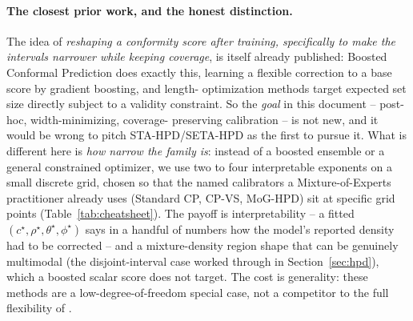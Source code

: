 \documentclass[11pt]{article}
\begin{document}
\paragraph{The closest prior work, and the honest distinction.} The idea of \emph{reshaping a
conformity score after training, specifically to make the intervals narrower while keeping
coverage}, is itself already published: Boosted Conformal Prediction \cite{xie2024boosted} does
exactly this, learning a flexible correction to a base score by gradient boosting, and length-%
optimization methods \cite{kiyani2024length} target expected set size directly subject to a
validity constraint. So the \emph{goal} in this document -- post-hoc, width-minimizing, coverage-%
preserving calibration -- is not new, and it would be wrong to pitch STA-HPD/SETA-HPD as the first
to pursue it. What is different here is \emph{how narrow the family is}: instead of a boosted
ensemble or a general constrained optimizer, we use two to four interpretable exponents on a
small discrete grid, chosen so that the named calibrators a Mixture-of-Experts practitioner already
uses (Standard CP, CP-VS, MoG-HPD) sit at specific grid points (Table~\ref{tab:cheatsheet}). The
payoff is interpretability -- a fitted $(c^\star,\rho^\star,\theta^\star,\phi^\star)$ says in a
handful of numbers how the model's reported density had to be corrected -- and a mixture-density
region shape that can be genuinely multimodal (the disjoint-interval case worked through in
Section~\ref{sec:hpd}), which a boosted scalar score does not target. The cost is generality: these
methods are a low-degree-of-freedom special case, not a competitor to the full flexibility of
\cite{xie2024boosted,kiyani2024length}.
\end{document}
